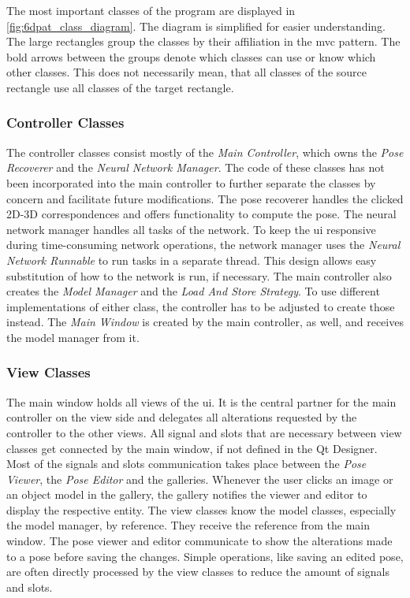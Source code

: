 The most important classes of the program are displayed in \fig \ref{fig:6dpat_class_diagram}. The diagram is simplified for easier understanding. The large rectangles group the classes by their affiliation in the \ac{mvc} pattern. The bold arrows between the groups denote which classes can use or know which other classes. This does not necessarily mean, that all classes of the source rectangle use all classes of the target rectangle. 

\subsubsection{Controller Classes}

The controller classes consist mostly of the \textit{Main Controller}, which owns the \textit{Pose Recoverer} and the \textit{Neural Network Manager}. The code of these classes has not been incorporated into the main controller to further separate the classes by concern and facilitate future modifications. The pose recoverer handles the clicked 2D-3D correspondences and offers functionality to compute the pose. The neural network manager handles all tasks of the network. To keep the \ac{ui} responsive during time-consuming network operations, the network manager uses the \textit{Neural Network Runnable} to run tasks in a separate thread. This design allows easy substitution of how to the network is run, if necessary. The main controller also creates the \textit{Model Manager} and the \textit{Load And Store Strategy}. To use different implementations of either class, the controller has to be adjusted to create those instead. The \textit{Main Window} is created by the main controller, as well, and receives the model manager from it.

\subsubsection{View Classes}

The main window holds all views of the \ac{ui}. It is the central partner for the main controller on the view side and delegates all alterations requested by the controller to the other views. All signal and slots that are necessary between view classes get connected by the main window, if not defined in the Qt Designer. Most of the signals and slots communication takes place between the \textit{Pose Viewer}, the \textit{Pose Editor} and the galleries. Whenever the user clicks an image or an object model in the gallery, the gallery notifies the viewer and editor to display the respective entity. The view classes know the model classes, especially the model manager, by reference. They receive the reference from the main window. The pose viewer and editor communicate to show the alterations made to a pose before saving the changes. Simple operations, like saving an edited pose, are often directly processed by the view classes to reduce the amount of signals and slots.

